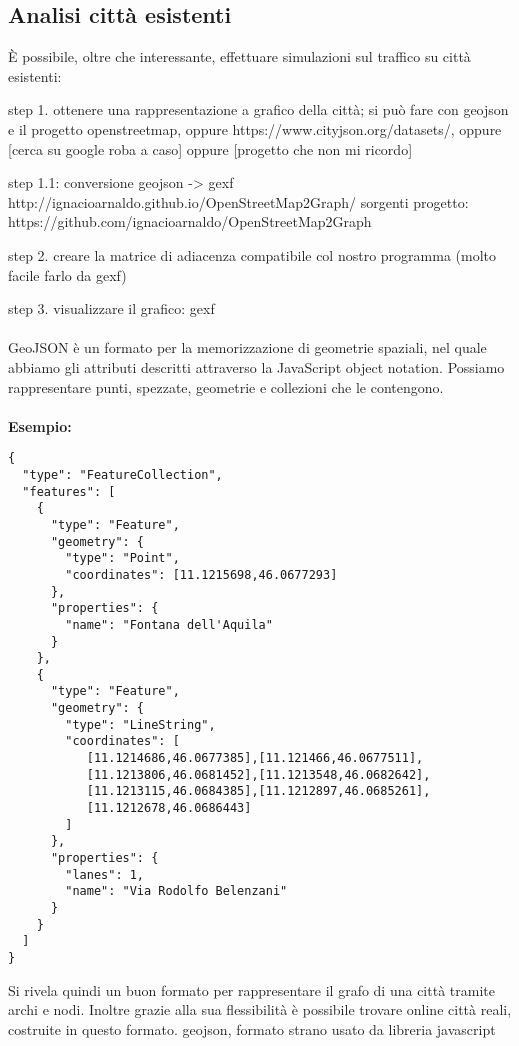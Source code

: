 \documentclass[main.tex]{subfiles}
\begin{document}
\subsection{Analisi città esistenti}
È possibile, oltre che interessante, effettuare simulazioni sul traffico su città esistenti: 

step 1. ottenere una rappresentazione a grafico della città; si può fare con geojson e il progetto openstreetmap, oppure https://www.cityjson.org/datasets/, oppure [cerca su google roba a caso] oppure [progetto che non mi ricordo]

step 1.1: conversione geojson -> gexf http://ignacioarnaldo.github.io/OpenStreetMap2Graph/
sorgenti progetto: https://github.com/ignacioarnaldo/OpenStreetMap2Graph

step 2. creare la matrice di adiacenza compatibile col nostro programma (molto facile farlo da gexf)

step 3. visualizzare il grafico: gexf 
\\
\\
GeoJSON è un formato per la memorizzazione di geometrie spaziali, nel quale abbiamo gli attributi descritti attraverso la JavaScript object notation.
Possiamo rappresentare punti, spezzate, geometrie e collezioni che le contengono.
\\
\\
\textbf{Esempio:}
\begin{lstlisting}
{
  "type": "FeatureCollection",
  "features": [
    {
      "type": "Feature",
      "geometry": {
        "type": "Point",
        "coordinates": [11.1215698,46.0677293]
      },
      "properties": {
        "name": "Fontana dell'Aquila"
      }
    },
    {
      "type": "Feature",
      "geometry": {
        "type": "LineString",
        "coordinates": [
           [11.1214686,46.0677385],[11.121466,46.0677511],
           [11.1213806,46.0681452],[11.1213548,46.0682642],
           [11.1213115,46.0684385],[11.1212897,46.0685261],
           [11.1212678,46.0686443]
        ]
      },
      "properties": {
        "lanes": 1,
        "name": "Via Rodolfo Belenzani"
      }
    }
  ]
}
\end{lstlisting}
Si rivela quindi un buon formato per rappresentare il grafo di una città tramite archi e nodi.
Inoltre grazie alla sua flessibilità è possibile trovare online città reali, costruite in questo formato.
geojson, formato strano usato da libreria javascript 
\end{document}
